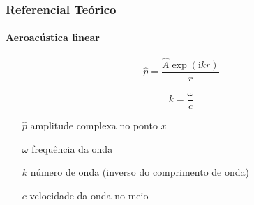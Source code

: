 \documentclass[aspectratio=169]{beamer}
\newcommand{\iu}{\mathrm{i}}
\begin{document}
\begin{frame}
\frametitle{Referencial Teórico}
\framesubtitle{Aeroacústica linear}

\begin{equation}
    \hat{p} = \frac{\hat{A} \exp (\iu k r)}{r}
\end{equation}

\begin{equation}
    k = \frac{\omega}{c}
\end{equation}

\begin{itemize}
    \item[$\hat{p}$] amplitude complexa no ponto $x$
    \item[$\omega$] frequência da onda
    \item[$k$] número de onda (inverso do comprimento de onda)
    \item[$c$] velocidade da onda no meio
\end{itemize}

\end{frame}
\end{document}
